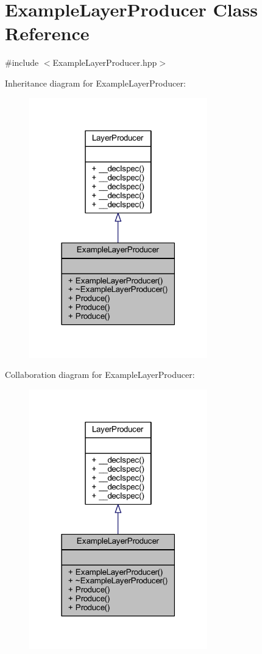 \hypertarget{class_example_layer_producer}{\section{Example\-Layer\-Producer Class Reference}
\label{class_example_layer_producer}
}


{\ttfamily \#include $<$Example\-Layer\-Producer.\-hpp$>$}



Inheritance diagram for Example\-Layer\-Producer\-:\nopagebreak
\begin{figure}[H]
\begin{center}
\leavevmode
\includegraphics[width=219pt]{class_example_layer_producer__inherit__graph}
\end{center}
\end{figure}


Collaboration diagram for Example\-Layer\-Producer\-:\nopagebreak
\begin{figure}[H]
\begin{center}
\leavevmode
\includegraphics[width=219pt]{class_example_layer_producer__coll__graph}
\end{center}
\end{figure}
